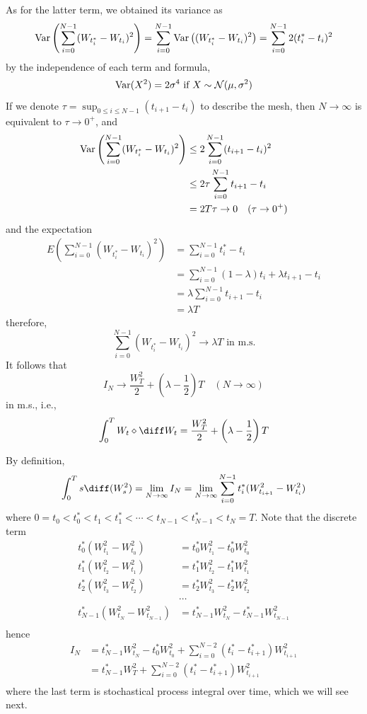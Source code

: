     As for the latter term, we obtained its variance as
    \[\mathrm{Var}\left(\sum_{i=0}^{N-1}(W_{t_i^*}-W_{t_i})^2\right)
    =\sum_{i=0}^{N-1}\mathrm{Var}\left((W_{t_i^*}-W_{t_i})^2\right)
    =\sum_{i=0}^{N-1}2(t_i^*-t_i)^2\]
    by the independence of each term and formula,
    \[\mathrm{Var}(X^2)=2\sigma^4\text{ if }X\sim\mathcal N(\mu,\sigma^2)\]
    If we denote $\tau=\sup_{0\leq i\leq N-1}(t_{i+1}-t_i)$ to describe
    the mesh, then $N\to\infty$ is equivalent to $\tau\to 0^+$, and
    \[\begin{aligned}
        \mathrm{Var}\left(\sum_{i=0}^{N-1}(W_{t_i^*}-W_{t_i})^2\right)
    &\leq 2\sum_{i=0}^{N-1}(t_{i+1}-t_i)^2\\
    &\leq 2\tau\sum_{i=0}^{N-1}t_{i+1}-t_i\\
    &=2T\tau\to 0\quad(\tau\to 0^+)
    \end{aligned}\]
    and the expectation
    \[\begin{aligned}
        E\left(\sum_{i=0}^{N-1}(W_{t_i^*}-W_{t_i})^2\right)
        &=\sum_{i=0}^{N-1}t_i^*-t_i\\
        &=\sum_{i=0}^{N-1}(1-\lambda)t_i+\lambda t_{i+1}-t_i\\
        &=\lambda\sum_{i=0}^{N-1}t_{i+1}-t_{i}\\
        &=\lambda T
    \end{aligned}\]
    therefore,
    \[\sum_{i=0}^{N-1}(W_{t_i^*}-W_{t_i})^2\to\lambda T
    \text{ in m.s.}\]
    It follows that
    \[I_N\to \frac{W_T^2}{2}+\left(\lambda-\frac{1}{2}\right)T
    \quad(N\to\infty)\]
    in m.s., i.e.,
    \[\int_0^TW_t\diamond\diff W_t=
    \frac{W_T^2}{2}+\left(\lambda-\frac{1}{2}\right)T\]

    \problem
    By definition,
    \[\int_0^Ts\diff(W_s^2)
    =\lim_{N\to\infty}I_N
    =\lim_{N\to\infty}\sum_{i=0}^{N-1}t_i^*(W_{t_{i+1}}^2-W_{t_i}^2)\]
    where
    $0=t_0<t_0^*<t_1<t_1^*<\cdots<t_{N-1}<t_{N-1}^*<t_N=T$.
    Note that the discrete term
    \[\begin{aligned}
        t_0^*(W_{t_1}^2-W_{t_0}^2)&=t_0^*W_{t_1}^2-t_0^*W_{t_0}^2\\
        t_1^*(W_{t_2}^2-W_{t_1}^2)&=t_1^*W_{t_2}^2-t_1^*W_{t_1}^2\\
        t_2^*(W_{t_3}^2-W_{t_2}^2)&=t_2^*W_{t_3}^2-t_2^*W_{t_2}^2\\
        &\cdots\\
        t_{N-1}^*(W_{t_N}^2-W_{t_{N-1}}^2)&=t_{N-1}^*W_{t_N}^2-t_{N-1}^*W_{t_{N-1}}^2\\
    \end{aligned}\]
    hence
    \[\begin{aligned}
        I_N
        &=t_{N-1}^*W_{t_N}^2-t_0^*W_{t_0}^2
          +\sum_{i=0}^{N-2}(t_i^*-t_{i+1}^*)W_{t_{i+1}}^2\\
        &=t^*_{N-1}W_T^2
          +\sum_{i=0}^{N-2}(t_i^*-t_{i+1}^*)W_{t_{i+1}}^2\\
    \end{aligned}\]
    where the last term is stochastical process integral
    over time, which we will see next.

